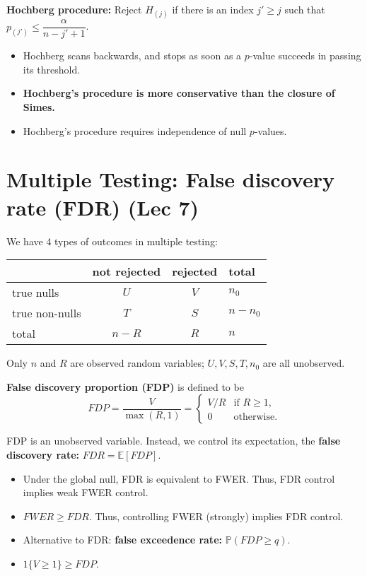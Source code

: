 \documentclass[twoside]{article}
\newcommand\bbE{\mathbb{E}}
\newcommand\bbP{\mathbb{P}}
\begin{document}
\textbf{Hochberg procedure:} Reject $H_{(j)}$ if there is an index $j' \geq j$ such that $p_{(j')} \leq \dfrac{\alpha}{n-j'+1}$.

\begin{itemize}
\item Hochberg scans backwards, and stops as soon as a $p$-value succeeds in passing its threshold.

\item \textbf{Hochberg's procedure is more conservative than the closure of Simes.}

\item Hochberg's procedure requires independence of null $p$-values.
\end{itemize}

\section{Multiple Testing: False discovery rate (FDR) (Lec 7)}
We have 4 types of outcomes in multiple testing:
\begin{center}
  \begin{tabular}{l|cc|l}
  	& not rejected & rejected & total \\ \hline
    true nulls & $U$ & $V$ & $n_0$  \\
    true non-nulls & $T$ & $S$ & $n-n_0$ \\ \hline
    total & $n-R$ & $R$ & $n$
  \end{tabular}
\end{center}

Only $n$ and $R$ are observed random variables; $U, V, S, T, n_0$ are all unobserved.

\textbf{False discovery proportion (FDP)} is defined to be
\[ FDP = \frac{V}{\max(R, 1)} = \begin{cases} V/R &\text{if } R \geq 1, \\ 0 &\text{otherwise.} \end{cases} \]

FDP is an unobserved variable. Instead, we control its expectation, the \textbf{false discovery rate:} $FDR = \bbE [FDP]$.

\begin{itemize}
\item Under the global null, FDR is equivalent to FWER. Thus, FDR control implies weak FWER control.
\item $FWER \geq FDR$. Thus, controlling FWER (strongly) implies FDR control.
\item Alternative to FDR: \textbf{false exceedence rate:} $\bbP(FDP \geq q)$.
\item $1\{V \geq 1\} \geq FDP$.
\end{itemize}
\end{document}
